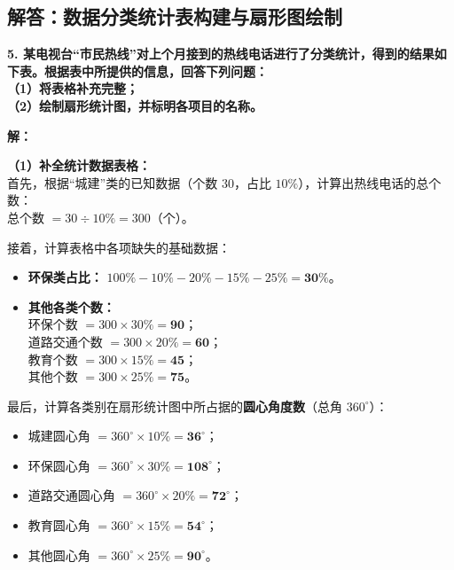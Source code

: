 \newpage

\newpage

\subsection{解答：数据分类统计表构建与扇形图绘制}

\vspace{0.6cm}

\textbf{5. 某电视台“市民热线”对上个月接到的热线电话进行了分类统计，得到的结果如下表。根据表中所提供的信息，回答下列问题：}\\
\textbf{（1）将表格补充完整；}\\
\textbf{（2）绘制扇形统计图，并标明各项目的名称。}

\vspace{0.4cm}

\textbf{解：}

\textbf{（1）补全统计数据表格：} \\
首先，根据“城建”类的已知数据（个数 $30$，占比 $10\%$），计算出热线电话的总个数：\\
总个数 $= 30 \div 10\% = 300$（个）。

接着，计算表格中各项缺失的基础数据：
\begin{itemize}
  \item \textbf{环保类占比：} $100\% - 10\% - 20\% - 15\% - 25\% = \boldsymbol{30\%}$。
  \item \textbf{其他各类个数：} \\
        环保个数 $= 300 \times 30\% = \boldsymbol{90}$；\\
        道路交通个数 $= 300 \times 20\% = \boldsymbol{60}$；\\
        教育个数 $= 300 \times 15\% = \boldsymbol{45}$；\\
        其他个数 $= 300 \times 25\% = \boldsymbol{75}$。
\end{itemize}

最后，计算各类别在扇形统计图中所占据的\textbf{圆心角度数}（总角 $360^\circ$）：
\begin{itemize}
  \item 城建圆心角 $= 360^\circ \times 10\% = \boldsymbol{36^\circ}$；
  \item 环保圆心角 $= 360^\circ \times 30\% = \boldsymbol{108^\circ}$；
  \item 道路交通圆心角 $= 360^\circ \times 20\% = \boldsymbol{72^\circ}$；
  \item 教育圆心角 $= 360^\circ \times 15\% = \boldsymbol{54^\circ}$；
  \item 其他圆心角 $= 360^\circ \times 25\% = \boldsymbol{90^\circ}$。
\end{itemize}

